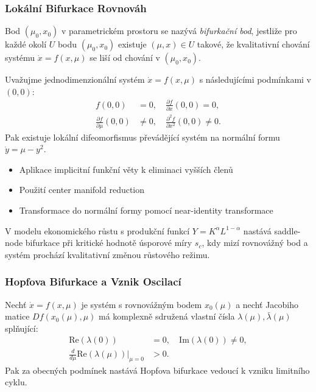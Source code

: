 \subsubsection{Lokální Bifurkace Rovnováh}

\begin{definition}
Bod $(\mu_0, x_0)$ v parametrickém prostoru se nazývá \emph{bifurkační bod}, jestliže pro každé okolí $U$ bodu $(\mu_0, x_0)$ existuje $(\mu, x) \in U$ takové, že kvalitativní chování systému $\dot{x} = f(x, \mu)$ se liší od chování v $(\mu_0, x_0)$.
\end{definition}

\begin{theorem}
Uvažujme jednodimenzionální systém $\dot{x} = f(x, \mu)$ s následujícími podmínkami v $(0,0)$:
\begin{align*}
f(0,0) &= 0, \quad \frac{\partial f}{\partial x}(0,0) = 0, \\
\frac{\partial f}{\partial \mu}(0,0) &\neq 0, \quad \frac{\partial^2 f}{\partial x^2}(0,0) \neq 0.
\end{align*}
Pak existuje lokální difeomorfismus převádějící systém na normální formu $\dot{y} = \mu - y^2$.
\end{theorem}

\begin{proofsketch}
\begin{itemize}
\item Aplikace implicitní funkční věty k eliminaci vyšších členů
\item Použití center manifold reduction
\item Transformace do normální formy pomocí near-identity transformace
\end{itemize}
\end{proofsketch}

\begin{application}
V modelu ekonomického růstu s produkční funkcí $Y = K^\alpha L^{1-\alpha}$ nastává saddle-node bifurkace při kritické hodnotě úsporové míry $s_c$, kdy mizí rovnovážný bod a systém prochází kvalitativní změnou růstového režimu.
\end{application}

\subsubsection{Hopfova Bifurkace a Vznik Oscilací}

\begin{theorem}
Nechť $\dot{x} = f(x, \mu)$ je systém s rovnovážným bodem $x_0(\mu)$ a nechť Jacobiho matice $Df(x_0(\mu), \mu)$ má komplexně sdružená vlastní čísla $\lambda(\mu), \bar{\lambda}(\mu)$ splňující:
\begin{align*}
\mathrm{Re}(\lambda(0)) &= 0, \quad \mathrm{Im}(\lambda(0)) \neq 0, \\
\frac{d}{d\mu}\mathrm{Re}(\lambda(\mu))\big|_{\mu=0} &> 0.
\end{align*}
Pak za obecných podmínek nastává Hopfova bifurkace vedoucí k vzniku limitního cyklu.
\end{theorem}

